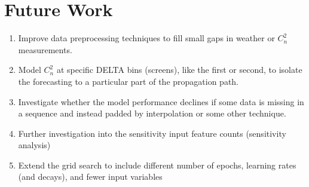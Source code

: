 \chapter{Future Work}
\label{ch6}

\begin{enumerate}
	\item Improve data preprocessing techniques to fill small gaps in weather or $C_{n}^{2}$ measurements.
	\item Model $C_{n}^{2}$ at specific DELTA bins (screens), like the first or second, to isolate the forecasting to a particular part of the propagation path.
	\item Investigate whether the model performance declines if some data is missing in a sequence and instead padded by interpolation or some other technique.
	\item Further investigation into the sensitivity input feature counts (sensitivity analysis)
	\item Extend the grid search to include different number of epochs, learning rates (and decays), and fewer input variables
\end{enumerate}